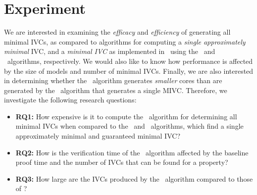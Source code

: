 \section{Experiment}
\label{sec:experiment}

\newcommand{\takeaway}[1]{
\vspace{6pt}
\noindent\fbox{\parbox{\textwidth}{#1}}
\vspace{6pt}
}
We are interested in examining the {\em efficacy} and {\em efficiency} of generating all minimal IVCs, as compared to algorithms for computing a {\em single approximately minimal} IVC, and a {\em minimal IVC} as implemented in~\cite{Ghass16} using the \ucalg\ and \ucbfalg\ algorithms, respectively.  We would also like to know how performance is affected by the size of models and number of minimal IVCs.  Finally, we are also interested in determining whether the \aivcalg\ algorithm generates {\em smaller} cores than are generated by the \ucbfalg\ algorithm that generates a single MIVC.  %
%
%
Therefore, we investigate the following research questions:
\begin{itemize}
  \item \textbf{RQ1:} How expensive is it to compute the \aivcalg ~algorithm for determining all minimal IVCs when compared to the \ucalg ~and \ucbfalg ~algorithms, which find a single approximately minimal and guaranteed minimal IVC?
  \item \textbf{RQ2:} How is the verification time of the \aivcalg ~algorithm affected by the baseline proof time and the number of IVCs that can be found for a property?
  \item \textbf{RQ3:} How large are the IVCs produced by the \aivcalg\ algorithm 
    compared to those of \ucbfalg ?
%
\end{itemize}



